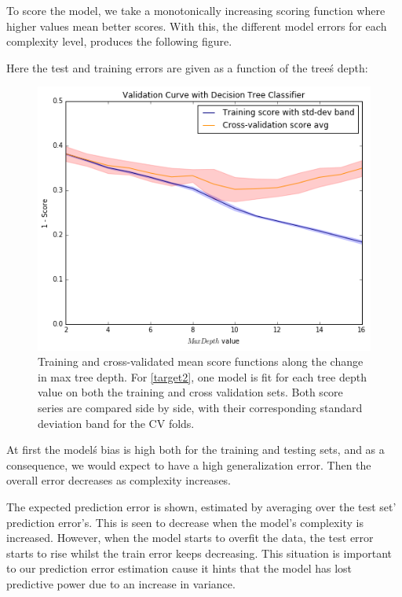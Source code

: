 To score the model, we take a monotonically increasing scoring function where
higher values mean better scores.
With this, the different model errors for each complexity level, produces the following figure.

Here the test and training errors are given as a function of the tree\'s depth:



\begin{figure}[h!]
\begin{center}
\includegraphics[width=1.2\columnwidth]{figures/figure-biasVariance/dtree_overfit_problem_2.png}
\caption{ Training and cross-validated mean score functions along the change in max tree depth.
For \cref{target2}, one model is fit for each tree depth value on both the training and cross validation sets.
Both score series are compared side by side, with their corresponding standard deviation band for the CV folds.}
\label{figure:dtree_overfit_problem_2}
\end{center}
\end{figure}


At first the model\'s bias is high both for the training and testing sets, and as a consequence, we would expect to have a high generalization error.
Then the overall error decreases as complexity increases.

The expected prediction error is shown, estimated by averaging over the test set' prediction error's.
This is seen to decrease when the model's complexity is increased.
However, when the model starts to overfit the data, the test error starts to rise whilst the train error keeps decreasing.
This situation is important to our prediction error estimation cause it hints that the model has lost predictive power due to an increase in variance.

